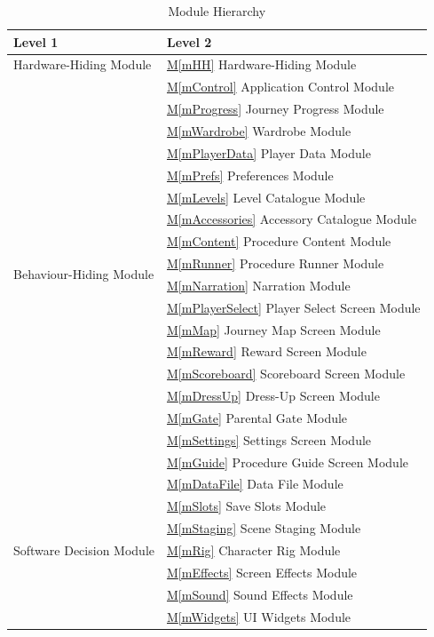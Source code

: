 \documentclass[10pt, titlepage]{article}
\newcommand{\mref}[1]{\texorpdfstring{\hyperref[md:#1]{M\ref*{#1}}}{M\ref*{#1}}}
\newcommand{\mfullref}[2]{\mref{#1} #2}
\begin{document}
\begin{table}[H]
\caption{Module Hierarchy}
\label{TblMH}
\renewcommand{\arraystretch}{1.3}
\begin{tabularx}{\textwidth}{@{}p{}X@{}}
\toprule
\textbf{Level 1} & \textbf{Level 2} \\
\midrule
Hardware-Hiding Module & \mfullref{mHH}{Hardware-Hiding Module} \\
\midrule
\multirow{18}{0.31\textwidth}{Behaviour-Hiding Module}
& \mfullref{mControl}{Application Control Module} \\
& \mfullref{mProgress}{Journey Progress Module} \\
& \mfullref{mWardrobe}{Wardrobe Module} \\
& \mfullref{mPlayerData}{Player Data Module} \\
& \mfullref{mPrefs}{Preferences Module} \\
& \mfullref{mLevels}{Level Catalogue Module} \\
& \mfullref{mAccessories}{Accessory Catalogue Module} \\
& \mfullref{mContent}{Procedure Content Module} \\
& \mfullref{mRunner}{Procedure Runner Module} \\
& \mfullref{mNarration}{Narration Module} \\
& \mfullref{mPlayerSelect}{Player Select Screen Module} \\
& \mfullref{mMap}{Journey Map Screen Module} \\
& \mfullref{mReward}{Reward Screen Module} \\
& \mfullref{mScoreboard}{Scoreboard Screen Module} \\
& \mfullref{mDressUp}{Dress-Up Screen Module} \\
& \mfullref{mGate}{Parental Gate Module} \\
& \mfullref{mSettings}{Settings Screen Module} \\
& \mfullref{mGuide}{Procedure Guide Screen Module} \\
\midrule
\multirow{7}{0.31\textwidth}{Software Decision Module}
& \mfullref{mDataFile}{Data File Module} \\
& \mfullref{mSlots}{Save Slots Module} \\
& \mfullref{mStaging}{Scene Staging Module} \\
& \mfullref{mRig}{Character Rig Module} \\
& \mfullref{mEffects}{Screen Effects Module} \\
& \mfullref{mSound}{Sound Effects Module} \\
& \mfullref{mWidgets}{UI Widgets Module} \\
\bottomrule
\end{tabularx}
\end{table}
\end{document}
